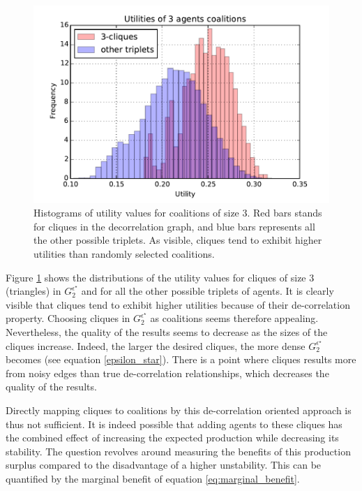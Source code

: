 \documentclass[conference]{IEEEtran}
\begin{document}
\begin{figure}
\includegraphics[scale=.6]{cliques_histo.pdf}
\caption{Histograms of utility values for coalitions of size 3. Red bars stands for cliques in the decorrelation graph, and blue bars represents all the other possible triplets. As visible, cliques tend to exhibit higher utilities than randomly selected coalitions.}
\label{fig:histo_cliques}
\end{figure}

Figure \ref{fig:histo_cliques} shows the distributions of the utility values for cliques of size 3 (triangles) in $ G_{2}^{\epsilon^{\star}} $ and for all the other possible triplets of agents. It is clearly visible that cliques tend to exhibit higher utilities because of their de-correlation property. Choosing cliques in $ G_{2}^{\epsilon^{\star}} $ as coalitions seems therefore appealing. Nevertheless, the quality of the results seems to decrease as the sizes of the cliques increase. Indeed, the larger the desired cliques, the more dense $ G_{2}^{\epsilon^{\star}} $ becomes (see equation \ref{epsilon_star}). There is a point where cliques results more from noisy edges than true de-correlation relationships, which decreases the quality of the results.

Directly mapping cliques to coalitions by this de-correlation oriented approach is thus not sufficient. It is indeed possible that adding agents to these cliques has the combined effect of increasing the expected production while decreasing its stability. The question revolves around measuring the benefits of this production surplus compared to the disadvantage of a higher unstability. This can be quantified by the marginal benefit of equation \ref{eq:marginal_benefit}.
\end{document}
